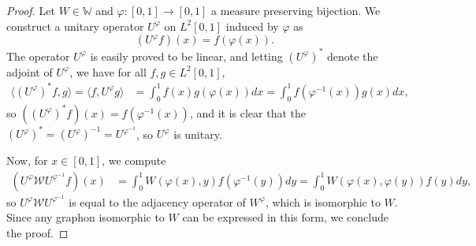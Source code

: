 \documentclass[10pt,a4paper]{amsart}
\def\WW{\mathbb{W}}
\def\calW{\mathcal{W}}
\begin{document}
\begin{proof}
    Let $W \in \WW$ and $\varphi: [0,1]\rightarrow [0,1]$ a measure preserving bijection. We construct a unitary operator $U^\varphi$ on $L^2 [0,1]$ induced by $\varphi$ as
    $$ (U^\varphi f)(x) = f(\varphi(x)). $$
    The operator $U^\varphi$ is easily proved to be linear, and letting $(U^\varphi)^*$ denote the adjoint of $U^\varphi$, we have for all $f,g\in L^2 [0,1]$,
    \begin{align*}
        \langle (U^\varphi)^* f, g\rangle = \langle f, U^\varphi g\rangle &= \int_0^1 f(x) g(\varphi(x)) dx = \int_0^1 f(\varphi^{-1}(x)) g(x) dx,
    \end{align*}
    so $((U^\varphi)^* f)(x) = f(\varphi^{-1}(x))$, and it is clear that the $(U^\varphi)^* = (U^\varphi)^{-1} = U^{\varphi^{-1}}$, so $U^\varphi$ is unitary.

    Now, for $x\in [0,1]$, we compute
    \begin{align*}
        (U^\varphi \calW U^{\varphi^{-1}} f)(x) & = \int_0^1 W(\varphi(x), y) f(\varphi^{-1}(y)) dy = \int_0^1 W(\varphi(x), \varphi(y)) f(y) dy,
    \end{align*}
    so $U^\varphi \calW U^{\varphi^{-1}}$ is equal to the adjacency operator of $W^\varphi$, which is isomorphic to $W$. Since any graphon isomorphic to $W$ can be expressed in this form, we conclude the proof.
\end{proof}
\end{document}
